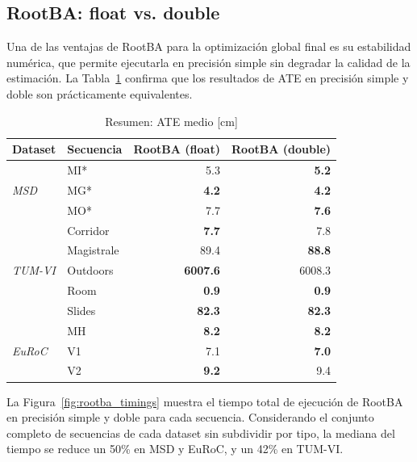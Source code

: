 \subsection{RootBA: float vs. double}

Una de las ventajas de RootBA para la optimización global final es su estabilidad numérica, que permite ejecutarla en precisión simple sin degradar la calidad de la estimación. La Tabla~\ref{tab:summary_rootba_ate} confirma que los resultados de ATE en precisión simple y doble son prácticamente equivalentes.
%
\begin{table}[!htbp]
\centering
\caption{Resumen: ATE medio [cm]}
\label{tab:summary_rootba_ate}
\begin{tabular}{llrr}
\toprule
\textbf{Dataset} & \textbf{Secuencia} & \textbf{RootBA (float)} & \textbf{RootBA (double)} \\
\midrule
\multirow{3}{*}{\textit{MSD}}    & MI*       & 5.3               & \textbf{5.2}    \\
                                  & MG*       & \textbf{4.2}      & \textbf{4.2}    \\
                                  & MO*       & 7.7               & \textbf{7.6}    \\
\midrule
\multirow{5}{*}{\textit{TUM-VI}} & Corridor  & \textbf{7.7}      & 7.8             \\
                                  & Magistrale& 89.4              & \textbf{88.8}   \\
                                  & Outdoors  & \textbf{6007.6}   & 6008.3          \\
                                  & Room      & \textbf{0.9}      & \textbf{0.9}    \\
                                  & Slides    & \textbf{82.3}     & \textbf{82.3}   \\
\midrule
\multirow{3}{*}{\textit{EuRoC}}  & MH        & \textbf{8.2}      & \textbf{8.2}    \\
                                  & V1        & 7.1               & \textbf{7.0}    \\
                                  & V2        & \textbf{9.2}      & 9.4             \\
\bottomrule
\end{tabular}
\end{table}

La Figura~\ref{fig:rootba_timings} muestra el tiempo total de ejecución de RootBA en precisión simple y doble para cada secuencia. Considerando el conjunto completo de secuencias de cada dataset sin subdividir por tipo, la mediana del tiempo se reduce un 50\% en MSD y EuRoC, y un 42\% en TUM-VI.

